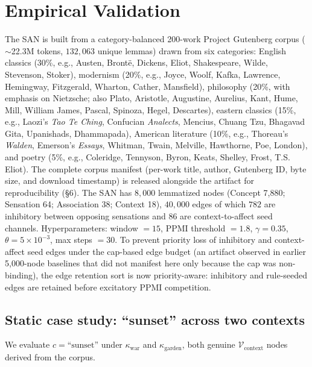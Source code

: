 \documentclass{article}
\begin{document}
\section{Empirical Validation}
\label{sec:exp}
The SAN is built from a category-balanced 200-work Project Gutenberg corpus
($\sim$22.3M tokens, $132{,}063$ unique lemmas) drawn from six categories:
English classics (30\%, e.g., Austen, Bront\"{e}, Dickens, Eliot, Shakespeare,
Wilde, Stevenson, Stoker), modernism (20\%, e.g., Joyce, Woolf, Kafka,
Lawrence, Hemingway, Fitzgerald, Wharton, Cather, Mansfield), philosophy
(20\%, with emphasis on Nietzsche; also Plato, Aristotle, Augustine,
Aurelius, Kant, Hume, Mill, William James, Pascal, Spinoza, Hegel,
Descartes), eastern classics (15\%, e.g., Laozi's \emph{Tao Te Ching},
Confucian \emph{Analects}, Mencius, Chuang Tzu, Bhagavad Gita, Upanishads,
Dhammapada), American literature (10\%, e.g., Thoreau's \emph{Walden},
Emerson's \emph{Essays}, Whitman, Twain, Melville, Hawthorne, Poe, London),
and poetry (5\%, e.g., Coleridge, Tennyson, Byron, Keats, Shelley, Frost,
T.S. Eliot). The complete corpus manifest (per-work title, author,
Gutenberg ID, byte size, and download timestamp) is released alongside the
artifact for reproducibility (\S 6).
The SAN has $8{,}000$ lemmatized nodes (Concept 7{,}880; Sensation 64;
Association 38; Context 18), $40{,}000$ edges of which $782$ are inhibitory
between opposing sensations and $86$ are context-to-affect seed channels.
Hyperparameters: window $=15$, PPMI threshold $=1.8$, $\gamma=0.35$,
$\theta=5\times 10^{-3}$, max steps $=30$. To prevent priority loss of
inhibitory and context-affect seed edges under the cap-based edge budget
(an artifact observed in earlier 5{,}000-node baselines that did not
manifest here only because the cap was non-binding), the edge retention
sort is now priority-aware: inhibitory and rule-seeded edges are retained
before excitatory PPMI competition.

\subsection{Static case study: ``sunset'' across two contexts}
\label{subsec:sunset}
We evaluate $c = \text{``sunset''}$ under
$\kappa_{\text{war}}$ and $\kappa_{\text{garden}}$, both genuine
$\mathcal{V}_{\text{context}}$ nodes derived from the corpus.
\end{document}
